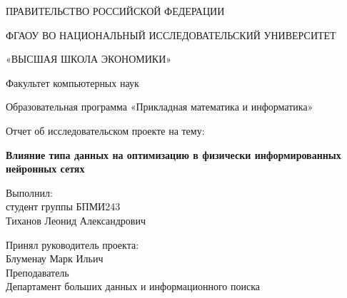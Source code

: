 \documentclass[14pt,a4paper]{extarticle}
\begin{document}
\thispagestyle{empty}

\begingroup
\fontsize{12}{14}\selectfont

\begin{center}
ПРАВИТЕЛЬСТВО РОССИЙСКОЙ ФЕДЕРАЦИИ

\vspace{0.2cm}

ФГАОУ ВО НАЦИОНАЛЬНЫЙ ИССЛЕДОВАТЕЛЬСКИЙ УНИВЕРСИТЕТ

\vspace{0.15cm}

«ВЫСШАЯ ШКОЛА ЭКОНОМИКИ»

\vspace{0.8cm}

Факультет компьютерных наук

\vspace{0.25cm}

Образовательная программа «Прикладная математика и информатика»

\vspace{1.45cm}

Отчет об исследовательском проекте на тему:

\vspace{0.35cm}

\textbf{Влияние типа данных на оптимизацию в физически информированных нейронных сетях}
\end{center}

\vspace{1.3cm}

\noindent
\begin{minipage}[t]{0.55\textwidth}
\raggedright
Выполнил:\\
студент группы БПМИ243\\
Тиханов Леонид Александрович
\end{minipage}


\vspace{1.1cm}

\noindent
\begin{minipage}[t]{0.55\textwidth}
\raggedright
Принял руководитель проекта:\\
Блуменау Марк Ильич \\
Преподаватель \\
Департамент больших данных и информационного поиска
\end{minipage}
\hfill
\begin{minipage}[t]{0.34\textwidth}
\centering
\end{minipage}

\vfill
\end{document}
